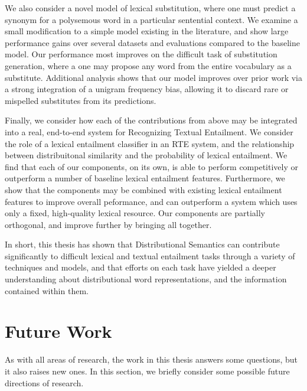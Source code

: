 We also consider a novel model of lexical substitution, where one must predict
a synonym for a polysemous word in a particular sentential context. We examine
a small modification to a simple model existing in the literature, and show
large performance gains over several datasets and evaluations compared to the
baseline model. Our performance most improves on the difficult task of
substitution generation, where a one may propose any word from the entire
vocabulary as a substitute. Additional analysis shows that our model improves
over prior work via a strong integration of a unigram frequency bias, allowing
it to discard rare or mispelled substitutes from its predictions.

Finally, we consider how each of the contributions from above may be integrated
into a real, end-to-end system for Recognizing Textual Entailment. We consider
the role of a lexical entailment classifier in an RTE system, and the
relationship between distribuitonal similarity and the probability of lexical
entailment. We find that each of our components, on its own, is able to
perform competitively or outperform a number of baseline lexical entailment
features. Furthermore, we show that the components may be combined with
existing lexical entailment features to improve overall peformance, and can
outperform a system which uses only a fixed, high-quality lexical resource.
Our components are partially orthogonal, and improve further by bringing all
together.

In short, this thesis has shown that Distributional Semantics can contribute
significantly to difficult lexical and textual entailment tasks through a
variety of techniques and models, and that efforts on each task have yielded
a deeper understanding about distributional word representations, and the
information contained within them.


\section{Future Work}


As with all areas of research, the work in this thesis answers some questions,
but it also raises new ones. In this section, we briefly consider some possible
future directions of research.

